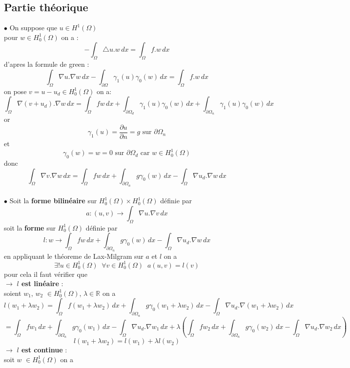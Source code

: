 \documentclass{article}
\begin{document}
\subsection{Partie théorique}
$\bullet$ On suppose que $u \in H^{1}(\Omega)$ \\
pour $w \in H_{0}^{1}(\Omega)$ on a :
$$
- \int_{\Omega} \triangle u . w \,dx = \int_{\Omega} f . w \,dx
$$
d'apres la formule de green :
$$
\int_{\Omega} \nabla u . \nabla w \,dx - \int_{\partial \Omega} \gamma_{1}(u) \gamma_{0}(w) \,dx = \int_{\Omega} f . w \,dx
$$
on pose $v = u - u_d \in H_{0}^{1}(\Omega)$ on a:
$$
\int_{\Omega} \nabla (v + u_d) . \nabla w \,dx  = \int_{\Omega} f w \,dx + \int_{\partial \Omega_{d}} \gamma_{1}(u) \gamma_{0}(w) \,dx + \int_{\partial \Omega_{n}} \gamma_{1}(u) \gamma_{0}(w) \,dx 
$$
or 
$$
\gamma_1(u) = \frac{\partial u}{\partial n} = g \textrm{ sur } \partial \Omega_{n}
$$
et
$$
\gamma_0(w) = w = 0 \textrm{ sur } \partial \Omega_{d} \textrm{ car } w \in H_{0}^{1}(\Omega)
$$
donc 
$$
\boxed{\int_{\Omega} \nabla v . \nabla w \,dx = \int_{\Omega} f w \,dx + \int_{\partial \Omega_{n}} g \gamma_{0}(w) \,dx - \int_{\Omega} \nabla u_d . \nabla w \,dx}
$$
\\
$\bullet$ Soit la \textbf{forme bilinéaire} sur $H_{0}^{1}(\Omega) \times H_{0}^{1}(\Omega)$ définie par 
$$
a : (u, v) \rightarrow \int_{\Omega} \nabla u . \nabla v \,dx
$$
soit la \textbf{forme} sur $H_{0}^{1}(\Omega)$ définie par
$$
l : w \rightarrow \int_{\Omega} f w \,dx + \int_{\partial \Omega_{n}} g \gamma_{0}(w) \,dx - \int_{\Omega} \nabla u_d . \nabla w \,dx
$$
en appliquant le théoreme de Lax-Milgram sur $a$ et $l$ on a 
$$
\boxed{\exists ! u \in H_{0}^{1}(\Omega) \; \; \forall v \in H_{0}^{1}(\Omega) \; \; a(u, v) = l(v)}
$$
pour cela il faut vérifier que \\
$\rightarrow$ \textbf{$l$ est linéaire} : \\
soient $w_1$, $w_2$ $\in H_{0}^{1}(\Omega)$, $\lambda \in \mathbb{R}$ on a 
$$
l(w_1 + \lambda w_2) = \int_{\Omega} f (w_1 + \lambda w_2) \,dx + \int_{\partial \Omega_{n}} g \gamma_{0}(w_1 + \lambda w_2) \,dx - \int_{\Omega} \nabla u_d . \nabla (w_1 + \lambda w_2) \,dx
$$
$$
= \int_{\Omega} f w_1 \,dx + \int_{\partial \Omega_{n}} g \gamma_{0}(w_1) \,dx - \int_{\Omega} \nabla u_d . \nabla w_1 \,dx + \lambda(\int_{\Omega} f w_2 \,dx + \int_{\partial \Omega_{n}} g \gamma_{0}(w_2) \,dx - \int_{\Omega} \nabla u_d . \nabla w_2 \,dx)
$$
$$
l(w_1 + \lambda w_2) = l(w_1) + \lambda l(w_2)
$$
$\rightarrow$ \textbf{$l$ est continue} : \\
soit $w$ $\in H_{0}^{1}(\Omega)$ on a 
\end{document}
